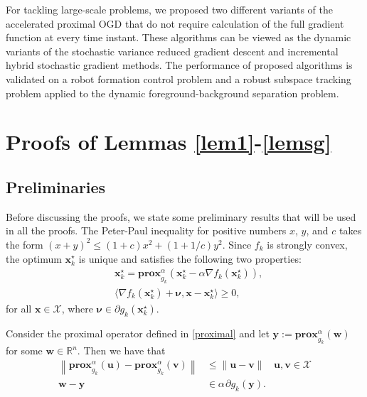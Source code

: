 \documentclass[draftcls,onecolumn,12pt]{IEEEtran}
\theoremstyle{plain}
\def\v{\mathbf{v}}
\def\u{\mathbf{u}}
\def\x{\mathbf{x}}
\def\y{\mathbf{y}}
\def\cX {\mathcal{X}}
\def\Rn{\mathbb{R}}
\def\w{\mathbf{w}}
\def\xks{\x_k^\star}
\def\prox{\textbf{prox}}
\providecommand{\norm}[1]{\left\|#1\right\|}
\providecommand{\ip}[1]{\langle#1\rangle}
\providecommand{\pk}[1]{\prox_{g_k}^\alpha\!\!\left(#1\right)}
\theoremstyle{plain}
\theoremstyle{remark}
\begin{document}
For tackling large-scale problems, we proposed two different variants of the accelerated proximal OGD that do not require calculation of the full gradient function at every time instant. These algorithms can be viewed as the dynamic variants of the stochastic variance reduced gradient descent and incremental hybrid stochastic gradient methods. The performance of proposed algorithms is validated on a robot formation control problem and a robust subspace tracking problem applied to the dynamic foreground-background separation problem. 
\appendices
  		  
\section{Proofs of Lemmas \ref{lem1}-\ref{lemsg}}\label{proof:lemma1}
\subsection{Preliminaries}
Before discussing the proofs, we state some preliminary results that will be used in all the proofs. The Peter-Paul inequality for positive numbers $x$, $y$, and $c$ takes the form $(x+y)^2 \leq (1+c)x^2 + (1+1/c)y^2$. Since $f_k$ is strongly convex, the optimum $\xks$ is unique and satisfies the following two properties:
\begin{align}
&\xks = \pk{\xks - \alpha \nabla f_k(\xks)}, \label{xstar}\\
&\ip{\nabla f_{k}(\xks) + \boldsymbol{\nu},\x-\xks} \geq 0, \label{xopt}
\end{align} 
for all $\x \in \cX$, where $\boldsymbol{\nu} \in\partial g_{k}(\xks)$. 

Consider the proximal operator defined in \eqref{proximal} and let $\y := \pk{\w}$ for some $\w \in \Rn^n$. Then we have that
\begin{align}
\norm{\pk{\u} - \pk{\v}} &\leq \norm{\u-\v}  & \u,\v \in \cX\label{p1}\\ 
 \w-\y &\in \alpha \hspace{1pt} \partial  g_k(\y). \label{p2}
\end{align}
\end{document}
